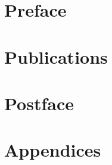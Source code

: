\documentclass[twoside,11pt,titlepage]{book}
\title{\themaintitle}
\author{Alex Cummaudo}
\date{\today}
\def\review{}
\begin{document}


\mainmatter

\ifdefined\review\begin{linenumbers}\else\fi

\part{Preface}\label{part:preface}
\cleardoublepage
\cleardoublepage
\cleardoublepage

\part{Publications}\label{part:publications}
\cleardoublepage
\cleardoublepage
\cleardoublepage
\cleardoublepage
\cleardoublepage
\cleardoublepage
\cleardoublepage
\cleardoublepage

\part{Postface}\label{part:postface}
\cleardoublepage


\ifdefined\review\end{linenumbers}\else\fi

\appendix

\part{Appendices}\label{part:appendices}




\end{document}
